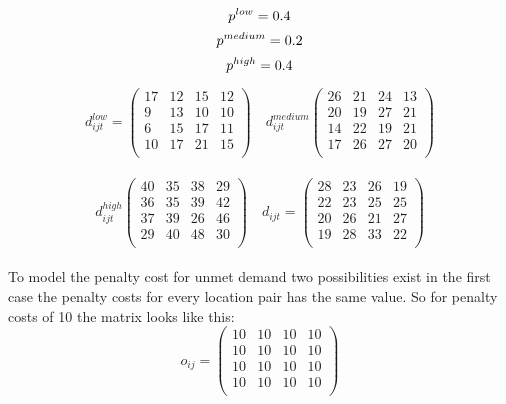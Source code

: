 \\
\begin{equation*}
p^{low} = 0.4\\
\end{equation*}
\begin{equation*}
p^{medium} = 0.2\\
\end{equation*}
\begin{equation*}
p^{high} = 0.4\\
\end{equation*}

\begin{equation*}
d_{i j t}^{low} =
\begin{pmatrix}
17& 12& 15& 12\\
9 &13& 10& 10\\
6 &15 &17 &11\\
10 &17& 21 &15\\
\end{pmatrix}
\quad
d_{i j t}^{medium}
\begin{pmatrix}
26& 21& 24 &13\\
20 &19& 27& 21\\
14 &22 &19& 21\\
17& 26& 27& 20\\
\end{pmatrix}
\end{equation*}
\\
\begin{equation*}
d_{i j t}^{high}
\begin{pmatrix}
40 &35& 38& 29\\
36& 35& 39& 42\\
37 &39& 26 &46\\
29& 40& 48& 30\\
\end{pmatrix}
\quad
d_{i j t}=
\begin{pmatrix}
28&23&26&19\\
22&23&25&25\\
20&26&21&27\\
19&28&33&22\\
\end{pmatrix}
\end{equation*}
\\
To model the penalty cost for unmet demand two possibilities exist in the first case the penalty costs for every location pair has the same value. So for penalty costs of 10 the matrix looks like this:
\\
\begin{equation*}
o_{i j}=
\begin{pmatrix}
10& 10& 10& 10\\
10 &10 &10 &10\\
10&10& 10&10\\
10& 10& 10& 10\\
\end{pmatrix}
\end{equation*}
